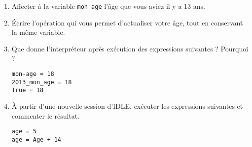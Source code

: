\exer{}
\setcounter{numques}{0}

\question{}
\begin{enumerate}[label = \emph{\alph*)}]
  \item Affecter à la variable  \texttt{mon\_age} l'âge que vous aviez il y a 13 ans.
  \item Écrire l'opération qui vous permet d'actualiser votre âge, tout en conservant la même variable.
  \item Que donne l'interpréteur après exécution des expressions suivantes ? Pourquoi ? 
\begin{lstlisting}
mon-age = 18
2013_mon_age = 18
True = 18
\end{lstlisting}
  \item \`A partir d'une nouvelle session d'IDLE, exécuter les expressions suivantes et commenter le résultat.
\begin{lstlisting}
age = 5
age = Age + 14
\end{lstlisting}
\end{enumerate}